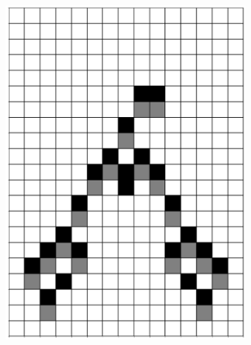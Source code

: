 \documentclass[12pt]{article}
\numberwithin{figure}{section} %
\begin{document}
\begin{figure}[H]
\begin{subfigure}{0.19\textwidth}
     		\subcaption{}
   	\end{subfigure}
      	\newline
   	\setcounter{subfigure}{0}
     	\begin{subfigure}{0.19\textwidth}
     		\centering
     		\includegraphics[width=\linewidth]{Section4/26.0}
     		\subcaption{}
   	\end{subfigure}
     	\begin{subfigure}{0.19\textwidth}
     		\centering

\end{subfigure}
\end{figure}
\end{document}
